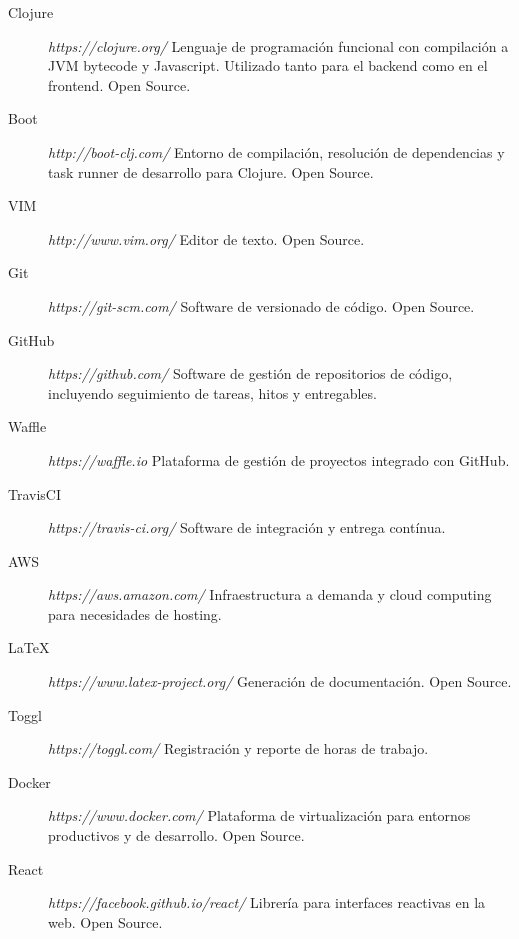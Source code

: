 \documentclass[a4paper,11pt]{article}
\begin{document}
\begin{description}

  \item[Clojure] \textit{https://clojure.org/} Lenguaje de programación
    funcional con compilación a JVM bytecode y Javascript. Utilizado tanto para
    el backend como en el frontend. Open Source.

  \item[Boot] \textit{http://boot-clj.com/} Entorno de compilación, resolución
    de dependencias y task runner de desarrollo para Clojure. Open Source.

  \item[VIM] \textit{http://www.vim.org/} Editor de texto. Open Source.

  \item[Git] \textit{https://git-scm.com/} Software de versionado de código.
    Open Source.

  \item[GitHub] \textit{https://github.com/} Software de gestión de
    repositorios de código, incluyendo seguimiento de tareas, hitos y
    entregables.

  \item[Waffle] \textit{https://waffle.io} Plataforma de gestión de proyectos
    integrado con GitHub.

  \item[TravisCI] \textit{https://travis-ci.org/} Software de integración y
    entrega contínua.

  \item[AWS] \textit{https://aws.amazon.com/} Infraestructura a demanda
    y cloud computing para necesidades de hosting.

  \item[LaTeX] \textit{https://www.latex-project.org/} Generación de
    documentación.  Open Source.

  \item[Toggl] \textit{https://toggl.com/} Registración y reporte de horas de
    trabajo.

  \item[Docker] \textit{https://www.docker.com/} Plataforma de virtualización
    para entornos productivos y de desarrollo. Open Source.

  \item[React] \textit{https://facebook.github.io/react/} Librería para
    interfaces reactivas en la web. Open Source.

\end{description}
\end{document}
